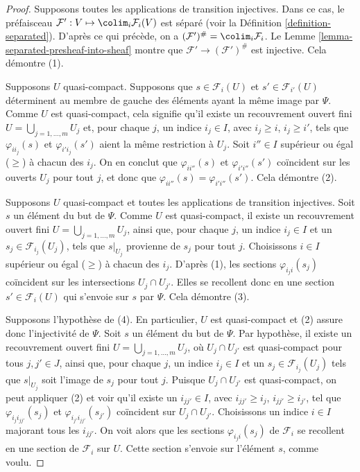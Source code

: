 \begin{proof}
Supposons toutes les applications de transition injectives. Dans ce cas, le préfaisceau
$\mathcal{F}' : V \mapsto \colim_i \mathcal{F}_i(V)$ est
séparé (voir la Définition \ref{definition-separated}).
D'après ce qui précède, on a
$(\mathcal{F}')^\# = \colim_i \mathcal{F}_i$.
Le Lemme \ref{lemma-separated-presheaf-into-sheaf} montre que
$\mathcal{F}' \to (\mathcal{F}')^\#$ est injective. Cela démontre (1).

\medskip\noindent
Supposons $U$ quasi-compact.
Supposons que $s \in \mathcal{F}_i(U)$ et
$s' \in \mathcal{F}_{i'}(U)$ déterminent au membre de gauche
des éléments ayant la même image par $\Psi$.
Comme $U$ est quasi-compact, cela signifie qu'il existe
un recouvrement ouvert fini $U = \bigcup_{j = 1, \ldots, m} U_j$
et, pour chaque $j$, un indice $i_j \in I$, avec $i_j \geq i$, $i_j \geq i'$,
tels que $\varphi_{ii_j}(s)$ et $\varphi_{i'i_j}(s')$ aient la
même restriction à $U_j$.
Soit $i''\in I$ supérieur ou égal ($\geq$) à chacun des $i_j$.
On en conclut que $\varphi_{ii''}(s)$ et $\varphi_{i'i''}(s')$
coïncident sur les ouverts $U_j$ pour tout $j$, et donc que
$\varphi_{ii''}(s) = \varphi_{i'i''}(s')$. Cela démontre (2).

\medskip\noindent
Supposons $U$ quasi-compact et toutes les applications de transition injectives.
Soit $s$ un élément du but de $\Psi$.
Comme $U$ est quasi-compact,
il existe un recouvrement ouvert fini $U = \bigcup_{j = 1, \ldots, m} U_j$,
ainsi que, pour chaque $j$, un indice $i_j \in I$ et un $s_j \in \mathcal{F}_{i_j}(U_j)$,
tels que $s|_{U_j}$ provienne de $s_j$ pour tout $j$.
Choisissons $i \in I$ supérieur ou égal ($\geq$) à chacun des $i_j$.
D'après (1), les sections $\varphi_{i_ji}(s_j)$ coïncident sur les
intersections $U_j \cap U_{j'}$. Elles se recollent donc en une section
$s' \in \mathcal{F}_i(U)$ qui s'envoie sur $s$ par $\Psi$.
Cela démontre (3).

\medskip\noindent
Supposons l'hypothèse de (4). En particulier,
$U$ est quasi-compact et (2) assure donc l'injectivité de $\Psi$.
Soit $s$ un élément du but de $\Psi$.
Par hypothèse, il existe un recouvrement ouvert fini
$U = \bigcup_{j = 1, \ldots, m} U_j$, où $U_j \cap U_{j'}$ est
quasi-compact pour tous $j, j' \in J$, ainsi que,
pour chaque $j$, un indice $i_j \in I$ et un $s_j \in \mathcal{F}_{i_j}(U_j)$
tels que $s|_{U_j}$ soit l'image de $s_j$ pour tout $j$.
Puisque $U_j \cap U_{j'}$ est quasi-compact, on peut appliquer (2)
et voir qu'il existe un $i_{jj'} \in I$, avec
$i_{jj'} \geq i_j$, $i_{jj'} \geq i_{j'}$, tel que
$\varphi_{i_ji_{jj'}}(s_j)$ et $\varphi_{i_{j'}i_{jj'}}(s_{j'})$
coïncident sur $U_j \cap U_{j'}$. Choisissons un indice $i \in I$
majorant tous les $i_{jj'}$. On voit alors que
les sections $\varphi_{i_ji}(s_j)$ de $\mathcal{F}_i$ se recollent
en une section de $\mathcal{F}_i$ sur $U$. Cette section s'envoie
sur l'élément $s$, comme voulu.
\end{proof}

